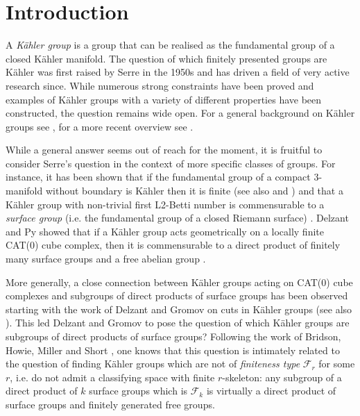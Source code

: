 \section{Introduction}
 A \textit{K\"ahler group} is a group that can be realised as the fundamental group of a closed K\"ahler manifold. The question of which finitely presented groups are K\"ahler was first raised by Serre in the 1950s and has driven a field of very active research since. While numerous strong constraints have been proved and examples of K\"ahler groups with a variety of different properties have been constructed, the question remains wide open. For a general background on K\"ahler groups see \cite{ABCKT-95}, for a more recent overview see \cite{Bur-10}. 

 While a general answer seems out of reach for the moment, it is fruitful to consider Serre's question in the context of more specific classes of groups. For instance, it has been shown that if the fundamental group of a compact 3-manifold without boundary is K\"ahler then it is finite \cite{DimSuc-09} (see also \cite{BisMjSes-12} and \cite{Kot-12-II}) and that a K\"ahler group with non-trivial first L2-Betti number is commensurable to a \textit{surface group} (i.e. the fundamental group of a closed Riemann surface) \cite{Gro-89}. Delzant and Py showed that if a K\"ahler group acts geometrically on a locally finite CAT(0) cube complex, then it is commensurable to a direct product of finitely many surface groups and a free abelian group \cite{DelPy-16}. 
 
 
 More generally, a close connection between K\"ahler groups acting on CAT(0) cube complexes and subgroups of direct products of surface groups has been observed starting with the work of Delzant and Gromov on cuts in K\"ahler groups \cite{DelGro-05} (see also \cite{Py-13, DelPy-16}). This led Delzant and Gromov to pose the question of which K\"ahler groups are subgroups of direct products of surface groups? Following the work of Bridson, Howie, Miller and Short \cite{BriHowMilSho-02, BriHowMilSho-09}, one knows that this question is intimately related to the question of finding K\"ahler groups which are not of \textit{finiteness type} $\mathcal{F}_r$ for some $r$, i.e. do not admit a classifying space with finite $r$-skeleton: any subgroup of a direct product of $k$ surface groups which is $\mathcal{F}_k$ is virtually a direct product of surface groups and finitely generated free groups.
 
